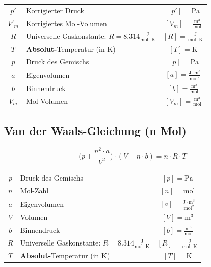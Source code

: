 \begin{tabular}{c l c}
	$p'$ & Korrigierter Druck & $[p'] = \mathrm{Pa}$ \\
	\rule{0pt}{10pt}$V'_m$ & Korrigiertes Mol-Volumen & $[V_m] = \mathrm{\frac{m^3}{mol}}$ \\
	\rule{0pt}{10pt}$R$ & Universelle Gaskonstante: $R = 8.314 \mathrm{\frac{J}{mol \cdot K}}$ & $[R] = \mathrm{\frac{J}{mol \cdot K}} $ \\
	$T$ & \textbf{Absolut-}Temperatur (in K) & $[T] = \mathrm{K}$ \\
	$p$ & Druck des Gemischs & $[p] = \mathrm{Pa}$ \\
	\rule{0pt}{10pt}$a$ & Eigenvolumen & $[a] = \mathrm{\frac{J \cdot m^3}{mol^2}}$ \\
	\rule{0pt}{10pt}$b$ & Binnendruck & $[b] = \mathrm{\frac{m^3}{mol}}$ \\
	\rule{0pt}{10pt}$V_m$ & Mol-Volumen & $[V_m] = \mathrm{\frac{m^3}{mol}}$ \\
\end{tabular}



\subsection{Van der Waals-Gleichung (n Mol)}

$$ \boxed{ \Big(  p + \frac{n^2 \cdot a}{V^2} \Big)  \cdot (V - n \cdot b) = n \cdot R \cdot T } $$



\begin{tabular}{c l c}
	$p$ & Druck des Gemischs & $[p] = \mathrm{Pa}$ \\
	$n$ & Mol-Zahl & $[n] = \mathrm{mol}$ \\
	\rule{0pt}{8pt}$a$ & Eigenvolumen & $[a] = \mathrm{\frac{J \cdot m^3}{mol^2}}$ \\
	$V$ & Volumen & $[V] = \mathrm{m^3}$ \\
	\rule{0pt}{8pt}$b$ & Binnendruck & $[b] = \mathrm{\frac{m^3}{mol}}$ \\
	\rule{0pt}{8pt}$R$ & Universelle Gaskonstante: $R = 8.314 \mathrm{\frac{J}{mol \cdot K}}$ & $[R] = \mathrm{\frac{J}{mol \cdot K}} $ \\
	$T$ & \textbf{Absolut-}Temperatur (in K) & $[T] = \mathrm{K}$ \\
\end{tabular}






